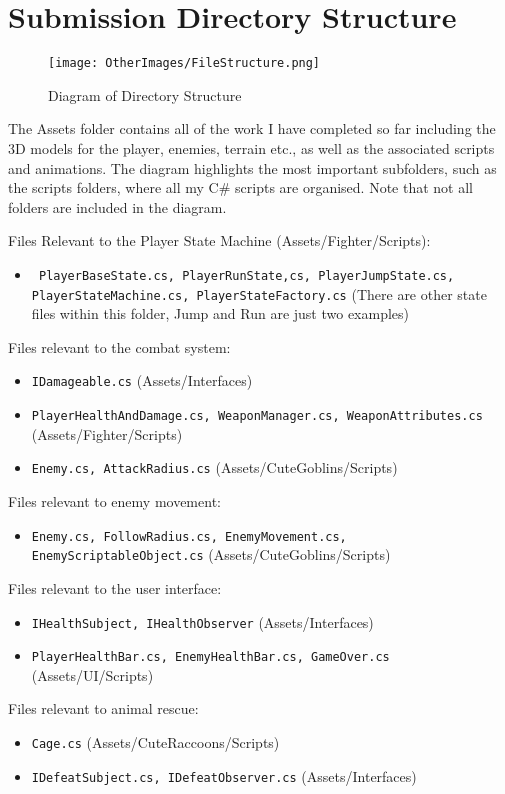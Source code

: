 \documentclass[10pt]{final_report}
\begin{document}
\newpage

\section{Submission Directory Structure}
\begin{figure}[h!]
    \centering
    \texttt{[image: OtherImages/FileStructure.png]}
    \caption{Diagram of Directory Structure}
    \label{fig:label_name2}
\end{figure}
The Assets folder contains all of the work I have completed so far including the 3D models for the player, enemies, terrain etc., as well as the associated scripts and animations. The diagram highlights the most important subfolders, such as the scripts folders, where all my C\# scripts are organised. Note that not all folders are included in the diagram. \newline

Files Relevant to the Player State Machine (Assets/Fighter/Scripts):
\begin{itemize}
    \item \texttt{ PlayerBaseState.cs, PlayerRunState,cs, PlayerJumpState.cs, PlayerStateMachine.cs, PlayerStateFactory.cs} (There are other state files within this folder, Jump and Run are just two examples)
\end{itemize}

Files relevant to the combat system:
\begin{itemize}
    \item \texttt{IDamageable.cs} (Assets/Interfaces)
    \item \texttt{PlayerHealthAndDamage.cs, WeaponManager.cs, WeaponAttributes.cs} (Assets/Fighter/Scripts)
    \item \texttt{Enemy.cs, AttackRadius.cs} (Assets/CuteGoblins/Scripts)
\end{itemize}
Files relevant to enemy movement:
\begin{itemize}
    \item \texttt{Enemy.cs, FollowRadius.cs, EnemyMovement.cs, EnemyScriptableObject.cs} (Assets/CuteGoblins/Scripts)
\end{itemize}
Files relevant to the user interface:
\begin{itemize}
    \item \texttt{IHealthSubject, IHealthObserver} (Assets/Interfaces)
    \item \texttt{PlayerHealthBar.cs, EnemyHealthBar.cs, GameOver.cs} (Assets/UI/Scripts)
\end{itemize}
Files relevant to animal rescue:
\begin{itemize}
    \item \texttt{Cage.cs} (Assets/CuteRaccoons/Scripts)
    \item \texttt{IDefeatSubject.cs, IDefeatObserver.cs} (Assets/Interfaces)
\end{itemize}
\end{document}
